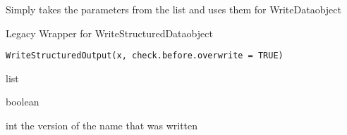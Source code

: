 \documentclass[a4paper]{book}
\begin{document}
%
\begin{Details}\relax
Simply takes the parameters from the list and uses them for WriteDataobject
\end{Details}
%
\begin{Description}\relax
Legacy Wrapper for WriteStructuredDataobject
\end{Description}
%
\begin{Usage}
\begin{verbatim}
WriteStructuredOutput(x, check.before.overwrite = TRUE)
\end{verbatim}
\end{Usage}
%
\begin{Arguments}
\begin{ldescription}
\item[\code{x}] list

\item[\code{check.before.overwrite}] boolean
\end{ldescription}
\end{Arguments}
%
\begin{Value}
int the version of the name that was written
\end{Value}
\printindex{}
\end{document}
